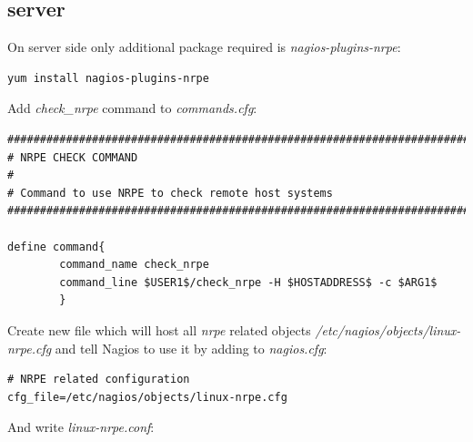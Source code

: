 \documentclass[10pt,a4paper,final]{report}
\begin{document}
\subsection{server}
On server side only additional package required is \emph{nagios-plugins-nrpe}:
\begin{lstlisting}
yum install nagios-plugins-nrpe
\end{lstlisting}
Add \emph{check\_nrpe} command to \emph{commands.cfg}:
\begin{lstlisting}
###############################################################################
# NRPE CHECK COMMAND
#
# Command to use NRPE to check remote host systems
###############################################################################

define command{
        command_name check_nrpe
        command_line $USER1$/check_nrpe -H $HOSTADDRESS$ -c $ARG1$
        }
\end{lstlisting}
Create new file which will host all \emph{nrpe} related objects \emph{/etc/nagios/objects/linux-nrpe.cfg} and tell Nagios to use it by adding to \emph{nagios.cfg}:
\begin{lstlisting}
# NRPE related configuration
cfg_file=/etc/nagios/objects/linux-nrpe.cfg
\end{lstlisting}
And write \emph{linux-nrpe.conf}:
\end{document}
